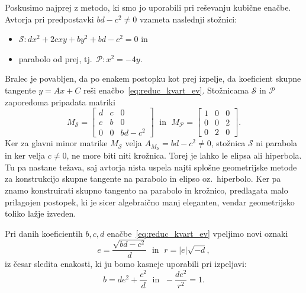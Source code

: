 Poskusimo najprej z metodo, ki smo jo uporabili pri reševanju kubične enačbe. Avtorja pri predpostavki $bd - c^2 \neq 0$ vzameta naslednji stožnici:
\begin{itemize}
    \item $\mathcal{S}: dx^2 + 2cxy + by^2 + bd - c^2 = 0$ in
    \item parabolo od prej, tj.\ $\mathcal{P}: x^2 = -4y$.
\end{itemize}
Bralec je povabljen, da po enakem postopku kot prej izpelje, da koeficient skupne tangente $y = Ax + C$ reši enačbo~\ref{eq:reduc_kvart_ev}. Stožnicama $\mathcal{S}$ in $\mathcal{P}$ zaporedoma pripadata matriki
$$ M_\mathcal{S} =
    \begin{bmatrix}
        d & c & 0\\
        c & b & 0\\
        0 & 0 & bd - c^2
    \end{bmatrix}
    \; \text{ in } \; M_\mathcal{P} =
    \begin{bmatrix}
        1 & 0 & 0\\
        0 & 0 & 2\\
        0 & 2 & 0
    \end{bmatrix}.
$$
Ker za glavni minor matrike $M_\mathcal{S}$ velja $A_{M_\mathcal{S}} = bd - c^2 \neq 0$, stožnica $\mathcal{S}$ ni parabola in ker velja $c \neq 0$, ne more biti niti krožnica. Torej je lahko le elipsa ali hiperbola. Tu pa nastane težava, saj avtorja nista uspela najti splošne geometrijske metode za konstrukcijo skupne tangente na parabolo in elipso oz.\ hiperbolo. Ker pa znamo konstruirati skupno tangento na parabolo in krožnico, predlagata malo prilagojen postopek, ki je sicer algebraično manj eleganten, vendar geometrijsko toliko lažje izveden.

Pri danih koeficientih $b, c, d$ enačbe~\ref{eq:reduc_kvart_ev} vpeljimo novi oznaki
$$ e = \frac{\sqrt{bd - c^2}}{d} \; \text{ in } \; r = |e|\sqrt{-d}, $$
iz česar sledita enakosti, ki ju bomo kasneje uporabili pri izpeljavi:
\begin{equation}
    \label{eq:kvarticni_enakosti}
    b= de^2 + \frac{c^2}{d} \; \text{ in } \; -\frac{de^2}{r^2} = 1.
\end{equation}

